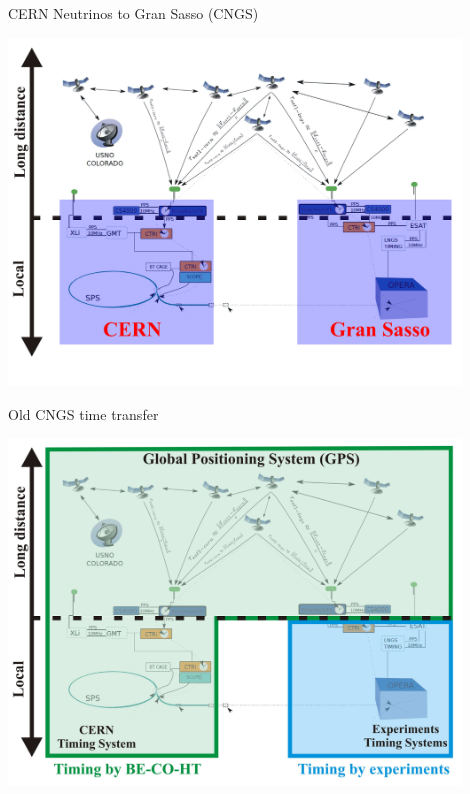 \documentclass[compress,red]{beamer}
\begin{document}
\begin{frame}{CERN Neutrinos to Gran Sasso (CNGS)}

      \begin{center}
      
      \includegraphics[width=0.9\textwidth]{applications/cngs-timing-1_v2.pdf} 
      \end{center}

\end{frame}
\begin{frame}{Old CNGS time transfer}

      \begin{center}
      \includegraphics[width=0.9\textwidth]{applications/cngs-timing-2.pdf}
      \end{center}

\end{frame}
\end{document}
